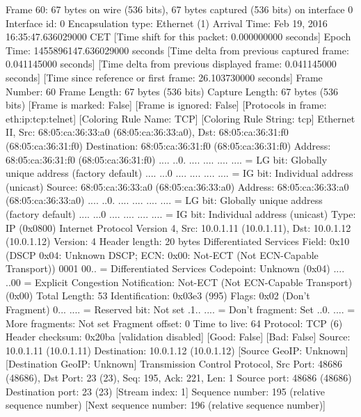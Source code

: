 Frame 60: 67 bytes on wire (536 bits), 67 bytes captured (536 bits) on interface 0
    Interface id: 0
    Encapsulation type: Ethernet (1)
    Arrival Time: Feb 19, 2016 16:35:47.636029000 CET
    [Time shift for this packet: 0.000000000 seconds]
    Epoch Time: 1455896147.636029000 seconds
    [Time delta from previous captured frame: 0.041145000 seconds]
    [Time delta from previous displayed frame: 0.041145000 seconds]
    [Time since reference or first frame: 26.103730000 seconds]
    Frame Number: 60
    Frame Length: 67 bytes (536 bits)
    Capture Length: 67 bytes (536 bits)
    [Frame is marked: False]
    [Frame is ignored: False]
    [Protocols in frame: eth:ip:tcp:telnet]
    [Coloring Rule Name: TCP]
    [Coloring Rule String: tcp]
Ethernet II, Src: 68:05:ca:36:33:a0 (68:05:ca:36:33:a0), Dst: 68:05:ca:36:31:f0 (68:05:ca:36:31:f0)
    Destination: 68:05:ca:36:31:f0 (68:05:ca:36:31:f0)
        Address: 68:05:ca:36:31:f0 (68:05:ca:36:31:f0)
        .... ..0. .... .... .... .... = LG bit: Globally unique address (factory default)
        .... ...0 .... .... .... .... = IG bit: Individual address (unicast)
    Source: 68:05:ca:36:33:a0 (68:05:ca:36:33:a0)
        Address: 68:05:ca:36:33:a0 (68:05:ca:36:33:a0)
        .... ..0. .... .... .... .... = LG bit: Globally unique address (factory default)
        .... ...0 .... .... .... .... = IG bit: Individual address (unicast)
    Type: IP (0x0800)
Internet Protocol Version 4, Src: 10.0.1.11 (10.0.1.11), Dst: 10.0.1.12 (10.0.1.12)
    Version: 4
    Header length: 20 bytes
    Differentiated Services Field: 0x10 (DSCP 0x04: Unknown DSCP; ECN: 0x00: Not-ECT (Not ECN-Capable Transport))
        0001 00.. = Differentiated Services Codepoint: Unknown (0x04)
        .... ..00 = Explicit Congestion Notification: Not-ECT (Not ECN-Capable Transport) (0x00)
    Total Length: 53
    Identification: 0x03e3 (995)
    Flags: 0x02 (Don't Fragment)
        0... .... = Reserved bit: Not set
        .1.. .... = Don't fragment: Set
        ..0. .... = More fragments: Not set
    Fragment offset: 0
    Time to live: 64
    Protocol: TCP (6)
    Header checksum: 0x20ba [validation disabled]
        [Good: False]
        [Bad: False]
    Source: 10.0.1.11 (10.0.1.11)
    Destination: 10.0.1.12 (10.0.1.12)
    [Source GeoIP: Unknown]
    [Destination GeoIP: Unknown]
Transmission Control Protocol, Src Port: 48686 (48686), Dst Port: 23 (23), Seq: 195, Ack: 221, Len: 1
    Source port: 48686 (48686)
    Destination port: 23 (23)
    [Stream index: 1]
    Sequence number: 195    (relative sequence number)
    [Next sequence number: 196    (relative sequence number)]

